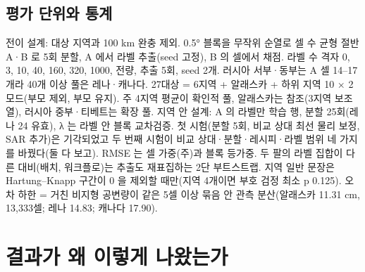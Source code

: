 \subsection{평가 단위와 통계}

전이 설계: 대상 지역과 100 km 완충 제외. 0.5° 블록을 무작위 순열로 셀 수 균형 절반 A·B 로 5회 분할, A 에서 라벨 추출(seed 고정), B 의  셀에서 채점. 라벨 수 격자 {0, 3, 10, 40, 160, 320, 1000, 전량}, 추출 5회, seed 2개. 러시아 서부·동부는 A 셀 14–17개라 40개 이상 풀은 레나·캐나다. 27대상 = 6지역 + 알래스카 + 하위 지역 10 × 2모드(부모 제외, 부모 유지). 주 4지역 평균이 확인적 풀, 알래스카는 참조(3지역 보조 열), 러시아 중부·티베트는 확장 풀. 지역 안 설계: A 의 라벨만 학습 행, 분할 25회(레나 24 유효), λ 는 라벨 안 블록 교차검증. 첫 시험(분할 5회, 비교 상대 최선 물리 보정, SAR 추가)은 기각되었고 두 번째 시험이 비교 상대·분할·레시피·라벨 범위 네 가지를 바꿨다(둘 다 보고). RMSE 는 셀 가중(주)과 블록 등가중. 두 팔의 라벨 집합이 다른 대비(배치, 워크플로)는 추출도 재표집하는 2단 부트스트랩. 지역 일반 문장은 Hartung–Knapp 구간이 0 을 제외할 때만(지역 4개이면 부호 검정 최소 p 0.125). 오차 하한 = 거친 비지형 공변량이 같은 5셀 이상 묶음 안 관측 분산(알래스카 11.31 cm, 13,333셀; 레나 14.83; 캐나다 17.90).

\section{결과가 왜 이렇게 나왔는가}

